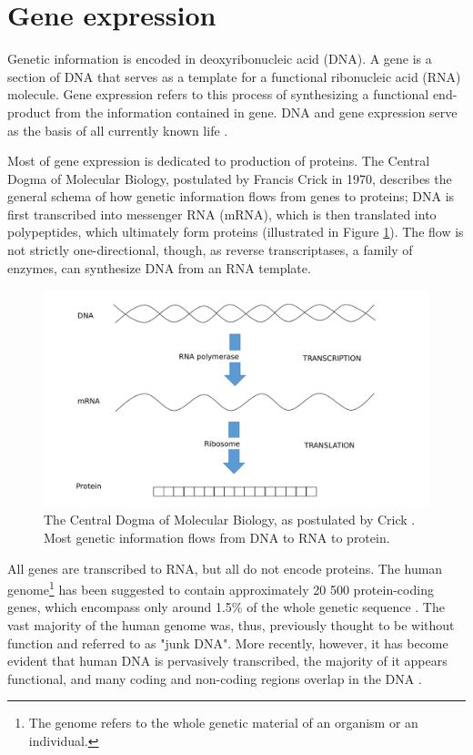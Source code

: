
\section{Gene expression}\label{gene-expression}

Genetic information is encoded in deoxyribonucleic acid (DNA). A
gene is a section of DNA that serves as a template for a functional
ribonucleic acid (RNA) molecule. Gene expression refers to this process of
synthesizing a functional end-product from the information contained in gene.
DNA and gene expression serve as the basis of all currently known life \citep{Strachan2011}.

Most of gene expression is dedicated to production of proteins. The Central
Dogma of Molecular Biology, postulated by Francis Crick in 1970, describes the
general schema of how genetic information flows from genes to proteins; DNA is
first transcribed into messenger RNA (mRNA), which is then translated into
polypeptides, which ultimately form proteins \citep{Crick1970} (illustrated in
Figure \ref{fig:central-dogma}). The flow is not strictly one-directional,
though, as reverse transcriptases, a family of enzymes, can synthesize DNA
from an RNA template.

\begin{figure}[!h]
  \centering
  \includegraphics[width=.8\linewidth]{figures/central_dogma.pdf}
  \caption{The Central Dogma of Molecular Biology, as postulated by Crick \citep{Crick1970}.
  Most genetic information flows from DNA to RNA to protein.}
  \label{fig:central-dogma}
\end{figure}

All genes are transcribed to RNA, but all do not encode proteins. The
human genome\footnote{The genome refers to the whole genetic material of an
organism or an individual.} has been suggested to contain approximately 20 500
protein-coding genes, which encompass only around 1.5\% of the whole genetic
sequence \citep{Clamp2007}. The vast majority of the human genome was, thus,
previously thought to be without function and referred to as "junk DNA". More
recently, however, it has become evident that human DNA is pervasively
transcribed, the majority of it appears functional, and many coding and
non-coding regions overlap in the DNA \citep{Strachan2011}.

